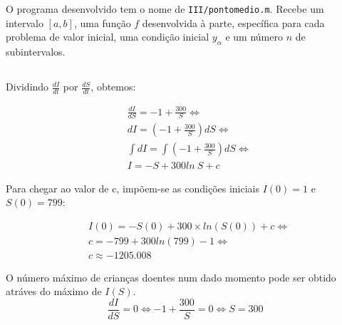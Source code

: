 \documentclass[portuguese, a4paper]{article}
\newcommand\tu[0]{\textunderscore}
\newcommand\eq[0]{\Leftrightarrow}
\begin{document}
\newpage
\section{} \label{sec:III}
	\subsection{} \label{sec:III.1}
	\par
	O programa desenvolvido tem o nome de \texttt{III/ponto\tu medio.m}. Recebe um intervalo
	$[a,b]$, uma função $f$ desenvolvida à parte, específica para cada problema de valor inicial,
	uma condição inicial $ y_\alpha $ e um número $n$ de subintervalos.

	\subsection{} \label{sec:III.2}
		\subsubsection{} \label{sec:III.2a)}
		\par
		Dividindo $\frac{dI}{dt}$ por $\frac{dS}{dt}$, obtemos:

		\begin{equation}
		\begin{split}
			& \frac{dI}{dS} = -1 + \frac{300}{S} \Leftrightarrow \\
			& dI = \left(-1 + \frac{300}{S}\right)dS \Leftrightarrow \\
			& \int dI = \int\left(-1 + \frac{300}{S}\right)dS \Leftrightarrow \\
			& I = -S + 300ln~S + c
		\end{split}
		\end{equation}

		\par
		Para chegar ao valor de c, impõem-se as condições iniciais $I(0) = 1$ e $S(0) = 799$:

		\begin{equation}
		\begin{split}
			& I(0) = -S(0) + 300 \times ln(S(0)) + c \eq \\
			& c = -799 + 300ln(799) - 1 \eq \\
			& c \approx -1205.008
		\end{split}
		\end{equation}

		\par
		O número máximo de crianças doentes num dado momento pode ser obtido
		atráves do máximo de $I(S)$.
		\begin{equation}
			\label{eq:root}
			\frac{dI}{dS} = 0 \eq -1 + \frac{300}{S} = 0
			\eq S = 300
		\end{equation}
\end{document}
